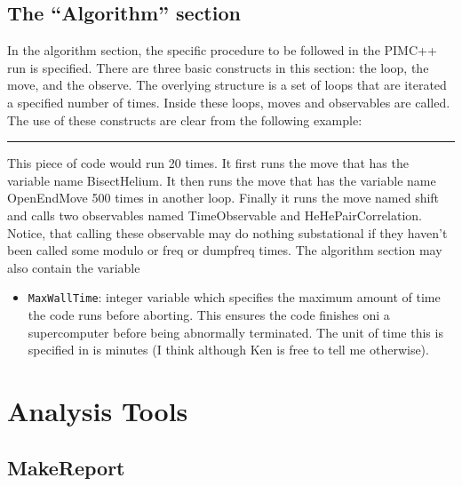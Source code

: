 \documentclass{book}
\begin{document}
\section{The ``Algorithm'' section}
In the algorithm section, the specific procedure to be followed in the
PIMC++ run is specified.  There are three basic constructs in this
section: the loop, the move, and the observe. The overlying structure
is a set of loops that are iterated a specified number of times.
Inside these loops, moves and observables are called.  The use of
these constructs are clear from the following example:
\rule{0.6cm}{0cm}
This piece of code would run 20 times.  It first runs the move that
has the variable name BisectHelium. It then runs the move that has the
variable name OpenEndMove 500 times in another loop.  Finally it runs
the move named shift and calls two observables named TimeObservable
and HeHePairCorrelation. Notice, that calling these observable may do
nothing substational if they haven't been called some modulo or freq
or dumpfreq times. The algorithm section may also contain the variable
\begin{itemize}
\item \texttt{MaxWallTime}: integer variable which specifies the
  maximum amount of time the code runs before aborting. This ensures
  the code finishes oni a supercomputer before being abnormally
  terminated.  The unit of time this is specified in is minutes (I
  think although Ken is free to tell me otherwise).
\end{itemize}

\chapter{Analysis Tools}
\section{MakeReport}
\end{document}
